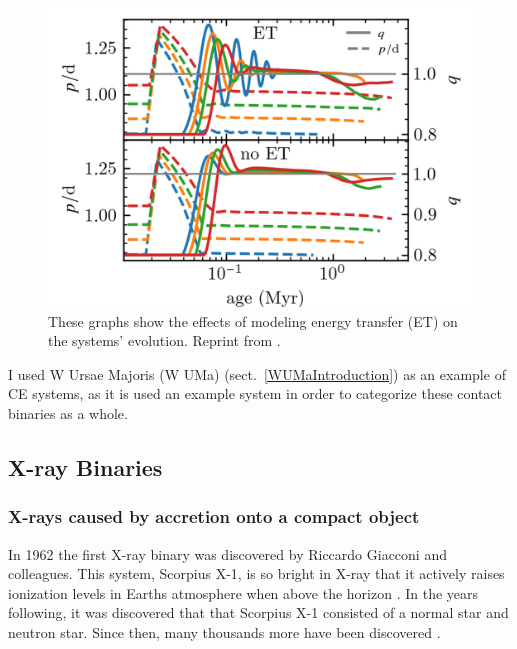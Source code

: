 \documentclass[12pt, a4paper]{article}
\begin{document}
        \begin{figure}[H]
            \centering
            \includegraphics[scale = .3]{figs/reused-figs/q-ratio_evolution_farby.png}
            \caption{These graphs show the effects of modeling energy transfer (ET) on the systems' evolution. Reprint from \parencite{Fabry_2025}.}
            \label{qEvolution}
        \end{figure}
        
        I used W Ursae Majoris (W UMa) (sect.~\ref{WUMaIntroduction}) as an example of CE systems, as it is used an example system in order to categorize these contact binaries as a whole.
    \subsection{X-ray Binaries} 
        \subsubsection{X-rays caused by accretion onto a compact object} \label{XrayAccretion}
            In 1962 the first X-ray binary was discovered by Riccardo Giacconi and colleagues. This system, Scorpius X-1, is so bright in X-ray that it actively raises ionization levels in Earths atmosphere when above the horizon \parencite{TaurisvandenHeuvel+2023} \parencite{Giacconi_1962}. In the years following, it was discovered that that Scorpius X-1 consisted of a normal star and neutron star. Since then, many thousands more have been discovered \parencite{Haardt_1993}.
\end{document}
